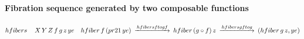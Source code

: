 \documentclass[11pt]{article}
\begin{document}
\paragraph{Fibration sequence generated by two composable functions}

$$
\begin{CD}
hfibers&\,\,\,\,\,\,\,&X\,Y\,Z\,f\,g\,z\,ye &\,\,\,\,\,\,& hfiber\,f\,(pr21\, ye) @>hfibersftogf>> hfiber\, (g\circ f)\, z @>hfibersgftog>> (hfiber \, g\, z, ye)
\end{CD}
$$













%
\end{document}
